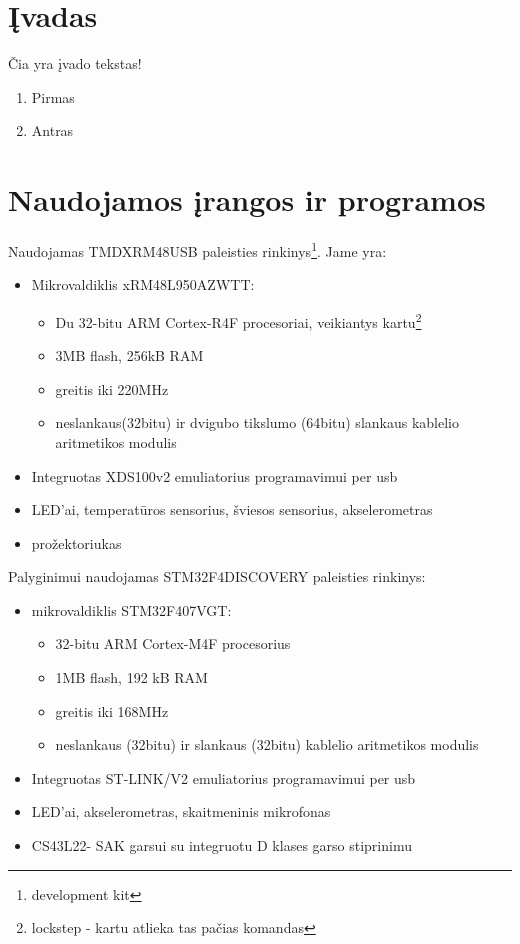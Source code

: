 \documentclass[a4paper, 12pt]{article} %
\begin{document}
\begin{onehalfspacing}

\section*{\k{I}vadas} %


\v{C}ia yra \k{i}vado tekstas!

\begin{enumerate}[itemsep=12pt, parsep=-12pt] %
\item Pirmas
\item Antras
\end{enumerate}
\newpage

\section{Naudojamos \k{i}rangos ir programos}
Naudojamas TMDXRM48USB paleisties rinkinys\footnote{development kit}. Jame yra:
\begin{itemize}
\item Mikrovaldiklis xRM48L950AZWTT:
\begin{itemize}
\item Du 32-bitu ARM Cortex-R4F procesoriai, veikiantys kartu\footnote{lockstep - kartu atlieka tas pa\v{c}ias komandas}
\item 3MB flash, 256kB RAM
\item greitis iki 220MHz
\item neslankaus(32bitu) ir dvigubo tikslumo (64bitu) slankaus kablelio aritmetikos modulis
\end{itemize} 
\item Integruotas XDS100v2 emuliatorius programavimui per usb
\item LED'ai, temperat\=uros sensorius, \v{s}viesos sensorius, akselerometras
\item pro\v{z}ektoriukas
\end{itemize}
Palyginimui naudojamas STM32F4DISCOVERY paleisties rinkinys:
\begin{itemize}
\item mikrovaldiklis STM32F407VGT:
\begin{itemize}
\item 32-bitu ARM Cortex-M4F procesorius
\item 1MB flash, 192 kB RAM 
\item greitis iki 168MHz 
\item neslankaus (32bitu) ir slankaus (32bitu) kablelio aritmetikos modulis
\end{itemize}
\item Integruotas ST-LINK/V2 emuliatorius programavimui per usb
\item LED'ai, akselerometras, skaitmeninis mikrofonas
\item CS43L22- SAK garsui su integruotu D klases garso stiprinimu
\end{itemize}


\end{onehalfspacing}
\end{document}

